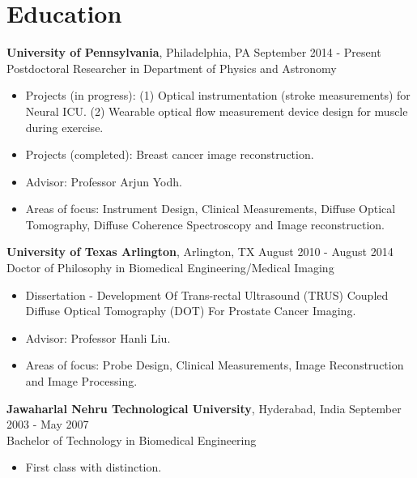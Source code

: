 \documentclass{my_cv}
\begin{document}

\section{Education}
\begin{flushleft}  
\textbf{University of Pennsylvania}, Philadelphia, PA  \hfill September 2014 - Present \\ 
Postdoctoral Researcher in Department of Physics and Astronomy \\ 
\vspace{-3mm}
\begin{itemize}\itemsep -2pt
\item Projects (in progress): (1) Optical instrumentation (stroke measurements) for Neural ICU. (2) Wearable optical flow measurement device design for muscle during exercise.  
\item Projects (completed): Breast cancer image reconstruction. 
\item Advisor: Professor Arjun Yodh.
\item Areas of focus: Instrument Design, Clinical Measurements, Diffuse Optical Tomography, Diffuse Coherence Spectroscopy and Image reconstruction.
\end{itemize}


\textbf{University of Texas Arlington}, Arlington, TX \hfill August 2010 - August 2014 \\ 
Doctor of Philosophy in Biomedical Engineering/Medical Imaging \\
\vspace{-3mm}
\begin{itemize}\itemsep -2pt
\item Dissertation -  Development Of Trans-rectal Ultrasound (TRUS) Coupled Diffuse Optical Tomography (DOT) For Prostate Cancer Imaging.
\item Advisor: Professor Hanli Liu. 
\item Areas of focus: Probe Design, Clinical Measurements, Image Reconstruction and Image Processing.
\end{itemize}
 
\textbf{Jawaharlal Nehru Technological University}, Hyderabad, India \hfill September 2003 - May 2007\\
Bachelor of Technology in Biomedical Engineering \\ 
\vspace{-3mm}
\begin{itemize}
\setlength\itemsep{0em} 
\item First class with distinction.
\end{itemize}
\end{flushleft}  
 
\end{document}
